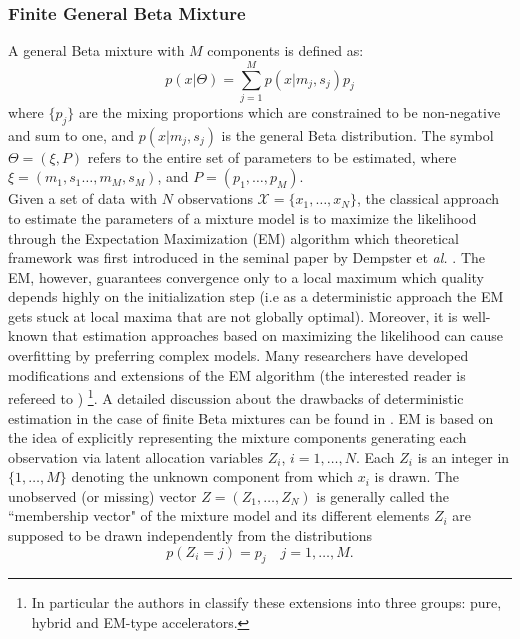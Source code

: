 \documentclass[journal,10pt]{elsart}
\begin{document}
\subsubsection{Finite General Beta Mixture}
A general Beta mixture with $M$ components is defined as:
\begin{equation}\label{eq4}
p(x|\Theta)=\sum_{j=1}^M p(x|m_j,s_j)p_j
\end{equation}
where $\{p_j\}$ are the
mixing proportions which are constrained to be non-negative and sum to one, and $p(x|m_j,s_j)$ is the general Beta distribution. The
symbol $\Theta=(\xi,P)$ refers to the entire set of parameters to be
estimated, where $\xi=(m_1,s_1\ldots,m_M,s_M)$, and $P=(p_1,\ldots,p_M)$.\\
Given a set of data with $N$ observations $\mathcal{X}=\{x_1,\ldots,x_N\}$, the classical approach to estimate the parameters of a mixture model is to maximize the likelihood through the Expectation Maximization (EM) algorithm  which theoretical framework was first introduced in the seminal paper by Dempster et \emph{al.} \cite{Demp1}. The EM, however, guarantees convergence only to a local maximum which quality depends highly on the initialization step (i.e as a deterministic approach the EM gets stuck at local maxima that are not globally optimal). Moreover, it is well-known that estimation approaches based on maximizing the likelihood can cause overfitting by preferring complex models. Many researchers have developed modifications and extensions of the EM algorithm (the interested reader is refereed to \cite{McLachlan1997,Meng1997,Jamshidian1997}) \footnote{In particular the authors in \cite{Jamshidian1997} classify these extensions into three groups: pure, hybrid and EM-type accelerators.}. A detailed discussion about the drawbacks of deterministic estimation in the case of finite Beta mixtures can be found in \cite{Bouguilastat2006}.  EM is based on the idea of explicitly representing the mixture components generating each observation via latent allocation variables $Z_i$, $i=1,\ldots,N$. Each $Z_i$ is an integer in $\{1,\ldots,M\}$ denoting the unknown component from which $x_i$ is drawn. The unobserved (or missing) vector $Z=(Z_1,\ldots,Z_N)$ is generally called the ``membership vector" of the mixture model and its different elements $Z_i$ are supposed to be drawn independently from the distributions
\begin{equation} \label{Zproba}
p(Z_i=j)=p_j \quad j=1,\ldots,M.
\end{equation}
\end{document}
